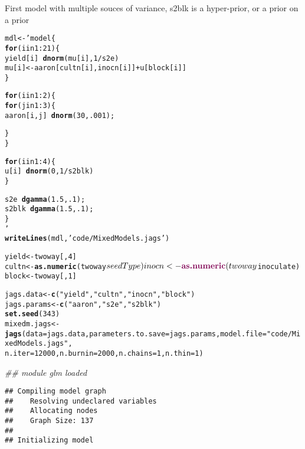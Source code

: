 \documentclass[12pt,letterpaper,oneside]{article}\usepackage{graphicx, color}
\makeatletter
\newcommand{\hlfunctioncall}[1]{\textcolor[rgb]{0.501960784313725,0,0.329411764705882}{\textbf{#1}}}%
\newcommand{\hlstring}[1]{\textcolor[rgb]{0.6,0.6,1}{#1}}%
\newenvironment{kframe}{%
 \def\at@end@of@kframe{}%
 \ifinner\ifhmode%
  \def\at@end@of@kframe{\end{minipage}}%
  \begin{minipage}{\columnwidth}%
 \fi\fi%
 \def\FrameCommand##1{\hskip\@totalleftmargin \hskip-\fboxsep
 \colorbox{shadecolor}{##1}\hskip-\fboxsep
     \hskip-\linewidth \hskip-\@totalleftmargin \hskip\columnwidth}%
 \MakeFramed {\advance\hsize-\width
   \@totalleftmargin\z@ \linewidth\hsize
   \@setminipage}}%
 {\par\unskip\endMakeFramed%
 \at@end@of@kframe}
\newenvironment{knitrout}{}{} %
\makeatother
\begin{document}
First model with multiple souces of variance, s2blk is a hyper-prior, or a prior on a prior
\begin{knitrout}\scriptsize
{}\color{fgcolor}\begin{kframe}
\begin{alltt}
mdl <- ' model \{
    \hlfunctioncall{for} (i in 1:21) \{
        yield[i] ~ \hlfunctioncall{dnorm}(mu[i], 1/s2e)
        mu[i] <- aaron[cultn[i], inocn[i]] + u[block[i]]
    \}

    \hlfunctioncall{for} (i in 1:2)\{
        \hlfunctioncall{for} (j in 1:3) \{
            aaron[i,j] ~ \hlfunctioncall{dnorm}(30, .001);

        \}
    \}

    \hlfunctioncall{for} (i in 1:4) \{
        u[i] ~ \hlfunctioncall{dnorm}(0, 1/s2blk)
    \}

    s2e ~ \hlfunctioncall{dgamma}(1.5, .1);
    s2blk ~ \hlfunctioncall{dgamma}(1.5, .1);
\}
'
\hlfunctioncall{writeLines}(mdl, \hlstring{'code/MixedModels.jags'})
\end{alltt}
\end{kframe}
\end{knitrout}


\begin{knitrout}\scriptsize
{}\color{fgcolor}\begin{kframe}
\begin{alltt}
yield <- twoway[, 4]
cultn <- \hlfunctioncall{as.numeric}(twoway$seedType)
inocn <- \hlfunctioncall{as.numeric}(twoway$inoculate)
block <- twoway[, 1]

jags.data <- \hlfunctioncall{c}(\hlstring{"yield"}, \hlstring{"cultn"}, \hlstring{"inocn"}, \hlstring{"block"})
jags.params <- \hlfunctioncall{c}(\hlstring{"aaron"}, \hlstring{"s2e"}, \hlstring{"s2blk"})
\hlfunctioncall{set.seed}(343)
mixedm.jags <- \hlfunctioncall{jags}(data = jags.data, parameters.to.save = jags.params, model.file = \hlstring{"code/MixedModels.jags"}, 
    n.iter = 12000, n.burnin = 2000, n.chains = 1, n.thin = 1)
\end{alltt}


{\ttfamily\noindent\itshape\textcolor{messagecolor}{\#\# module glm loaded}}\begin{verbatim}
## Compiling model graph
##    Resolving undeclared variables
##    Allocating nodes
##    Graph Size: 137
## 
## Initializing model
\end{verbatim}
\end{kframe}
\end{knitrout}
\end{document}
